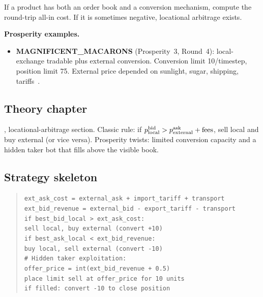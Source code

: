 \begin{keyfactbox}[Diagnostic]
If a product has both an order book and a conversion mechanism,
compute the round-trip all-in cost.  If it is sometimes negative,
locational arbitrage exists.
\end{keyfactbox}

\noindent
\textbf{Prosperity examples.}
\begin{itemize}
  \item \textbf{MAGNIFICENT\_MACARONS} (Prosperity~3, Round~4):
  local-exchange tradable plus external conversion.  Conversion limit
  10/timestep, position limit 75.  External price depended on
  sunlight, sugar, shipping, tariffs~\citep{frankfurthedgehogs2025}.
\end{itemize}

\subsection{Theory chapter}

, locational-arbitrage section.  Classic
rule: if $p^{\mathrm{bid}}_{\text{local}} > p^{\mathrm{ask}}_{\text{external}} + \text{fees}$,
sell local and buy external (or vice versa).  Prosperity twists:
limited conversion capacity and a hidden taker bot that fills above
the visible book.

\subsection{Strategy skeleton}

\begin{quote}
\texttt{ext\_ask\_cost = external\_ask + import\_tariff + transport}\\
\texttt{ext\_bid\_revenue = external\_bid - export\_tariff - transport}\\
\texttt{if best\_bid\_local > ext\_ask\_cost:}\\
\quad\texttt{sell local, buy external (convert +10)}\\
\texttt{if best\_ask\_local < ext\_bid\_revenue:}\\
\quad\texttt{buy local, sell external (convert -10)}\\
\texttt{\# Hidden taker exploitation:}\\
\texttt{offer\_price = int(ext\_bid\_revenue + 0.5)}\\
\texttt{place limit sell at offer\_price for 10 units}\\
\texttt{if filled: convert -10 to close position}
\end{quote}

